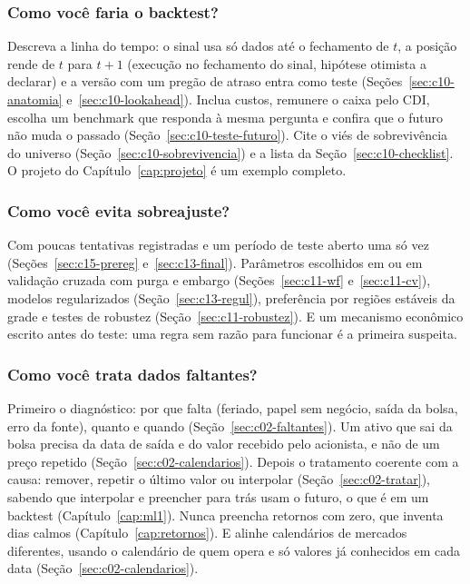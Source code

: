 \subsubsection{Como você faria o backtest?}
Descreva a linha do tempo: o sinal usa só dados até o fechamento de $t$, a posição rende de $t$ para $t+1$ (execução no fechamento do sinal, hipótese otimista a declarar) e a versão com um pregão de atraso entra como teste (Seções~\ref{sec:c10-anatomia} e~\ref{sec:c10-lookahead}). Inclua custos, remunere o caixa pelo CDI, escolha um benchmark que responda à mesma pergunta e confira que o futuro não muda o passado (Seção~\ref{sec:c10-teste-futuro}). Cite o viés de sobrevivência do universo (Seção~\ref{sec:c10-sobrevivencia}) e a lista da Seção~\ref{sec:c10-checklist}. O projeto do Capítulo~\ref{cap:projeto} é um exemplo completo.

\subsubsection{Como você evita sobreajuste?}
Com poucas tentativas registradas e um período de teste aberto uma só vez (Seções~\ref{sec:c15-prereg} e~\ref{sec:c13-final}). Parâmetros escolhidos em  ou em validação cruzada com purga e embargo (Seções~\ref{sec:c11-wf} e~\ref{sec:c11-cv}), modelos regularizados (Seção~\ref{sec:c13-regul}), preferência por regiões estáveis da grade e testes de robustez (Seção~\ref{sec:c11-robustez}). E um mecanismo econômico escrito antes do teste: uma regra sem razão para funcionar é a primeira suspeita.

\subsubsection{Como você trata dados faltantes?}
Primeiro o diagnóstico: por que falta (feriado, papel sem negócio, saída da bolsa, erro da fonte), quanto e quando (Seção~\ref{sec:c02-faltantes}). Um ativo que sai da bolsa precisa da data de saída e do valor recebido pelo acionista, e não de um preço repetido (Seção~\ref{sec:c02-calendarios}). Depois o tratamento coerente com a causa: remover, repetir o último valor ou interpolar (Seção~\ref{sec:c02-tratar}), sabendo que interpolar e preencher para trás usam o futuro, o que é  em um backtest (Capítulo~\ref{cap:ml1}). Nunca preencha retornos com zero, que inventa dias calmos (Capítulo~\ref{cap:retornos}). E alinhe calendários de mercados diferentes, usando o calendário de quem opera e só valores já conhecidos em cada data (Seção~\ref{sec:c02-calendarios}).

